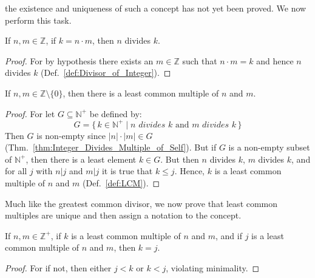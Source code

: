 \documentclass{article}                                                        %
\begin{document}
            the existence and uniqueness of such a concept has not yet been
            proved. We now perform this task.
            \begin{theorem}
                \label{thm:Integer_Divides_Multiple_of_Self}%
                If $n,m\in\mathbb{Z}$, if $k=n\cdot{m}$, then $n$ divides $k$.
            \end{theorem}
            \begin{proof}
                For by hypothesis there exists an $m\in\mathbb{Z}$ such that
                $n\cdot{m}=k$ and hence $n$ divides $k$
                (Def.~\ref{def:Divisor_of_Integer}).
            \end{proof}
            \begin{theorem}
                \label{thm:LCM_Existence_Theorem}%
                If $n,m\in\mathbb{Z}\setminus\{0\}$, then there is a least
                common multiple of $n$ and $m$.
            \end{theorem}
            \begin{proof}
                For let $G\subseteq\mathbb{N}^{+}$ be defined by:
                \begin{equation}
                    G=\{\,k\in\mathbb{N}^{+}\;|\;
                        n\textit{ divides }k\textrm{ and }
                        m\textit{ divides }k\,\}
                \end{equation}
                Then $G$ is non-empty since $|n|\cdot|m|\in{G}$
                (Thm.~\ref{thm:Integer_Divides_Multiple_of_Self}). But if $G$ is
                a non-empty subset of $\mathbb{N}^{+}$, then there is a least
                element $k\in{G}$. But then $n$ divides $k$, $m$ divides $k$,
                and for all $j$ with $n|j$ and $m|j$ it is true that
                $k\leq{j}$. Hence, $k$ is a least common multiple of $n$ and $m$
                (Def.~\ref{def:LCM}).
            \end{proof}
            Much like the greatest common divisor, we now prove that least
            common multiples are unique and then assign a notation to the
            concept.
            \begin{theorem}
                \label{thm:LCM_Unique}%
                If $n,m\in\mathbb{Z}^{+}$, if $k$ is a least common multiple of
                $n$ and $m$, and if $j$ is a least common multiple of $n$ and
                $m$, then $k=j$.
            \end{theorem}
            \begin{proof}
                For if not, then either $j<k$ or $k<j$, violating minimality.
            \end{proof}
\end{document}
